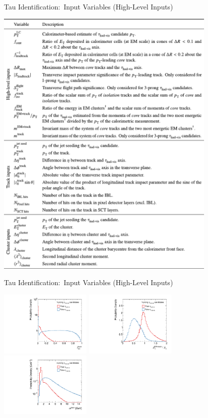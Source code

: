 \documentclass[11pt, xcolor={dvipsnames}, aspectratio=169]{beamer}
\begin{document}

\begin{frame}{Tau Identification:\ Input Variables (High-Level Inputs)}
  \centering

  \includegraphics[width=0.8\textwidth, trim=0 3.7in 0 0,
  clip]{backup/tauid_variable_table}
\end{frame}


\begin{frame}{Tau Identification:\ Input Variables (High-Level Inputs)}
  \centering

  \includegraphics[width=0.33\textwidth]{tauid/invars/invars_sumpttrkfrac_1P}%
  \includegraphics[width=0.33\textwidth]{tauid/invars/invars_ptratioeflowapprox_1P}%
  \includegraphics[width=0.33\textwidth]{tauid/invars/invars_masstrksys_3P}
\end{frame}
\end{document}
